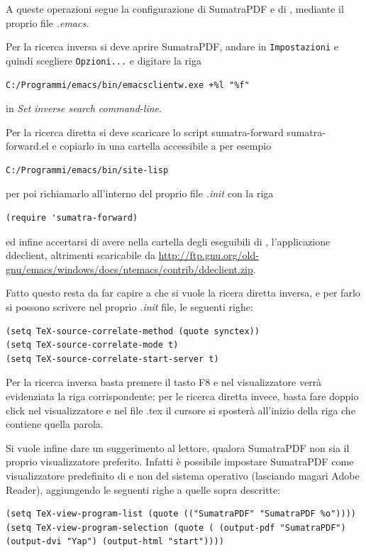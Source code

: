 \documentclass[11pt,a4paper]{article}
\begin{document}
A queste operazioni segue la configurazione di SumatraPDF e di \emacs,
mediante il proprio file \emph{.emacs}.

Per la ricerca inversa si deve aprire SumatraPDF, andare in
\texttt{Impostazioni} e quindi scegliere \texttt{Opzioni...} e
digitare la riga
\begin{Verbatim}
C:/Programmi/emacs/bin/emacsclientw.exe +%l "%f"
\end{Verbatim}
in \emph{Set inverse search command-line}.

Per la ricerca diretta si deve scaricare lo script
sumatra-forward %
{sumatra-forward.el} %
e copiarlo in una cartella accessibile a \emacs{} per esempio
\begin{Verbatim}
C:/Programmi/emacs/bin/site-lisp
\end{Verbatim}
 per poi richiamarlo all'interno del proprio file \emph{.init} con la riga
\begin{Verbatim}
(require 'sumatra-forward)
\end{Verbatim}
ed infine accertarsi di avere nella cartella degli eseguibili di
\emacs, l'applicazione \textsf{ddeclient}, altrimenti scaricabile da %
\url{http://ftp.gnu.org/old-gnu/emacs/windows/docs/ntemacs/contrib/ddeclient.zip}.

Fatto questo resta da far capire a \emacs{} che si vuole la ricera
diretta inversa, e per farlo si possono scrivere nel proprio
\emph{.init} file, le seguenti righe:
\begin{Verbatim}
(setq TeX-source-correlate-method (quote synctex))
(setq TeX-source-correlate-mode t)
(setq TeX-source-correlate-start-server t)
\end{Verbatim}

Per la ricerca inversa basta premere il tasto \textsf{F8} e nel
visualizzatore verrà evidenziata la riga corrispondente; per le
ricerca diretta invece, basta fare doppio click nel visualizzatore e
nel file .tex il cursore si sposterà all'inizio della riga che
contiene quella parola.

Si vuole infine dare un suggerimento al lettore, qualora
\textsf{SumatraPDF} non sia il proprio visualizzatore
preferito. Infatti è possibile impostare \textsf{SumatraPDF} come
visualizzatore predefinito di \emacs{} e non del sistema operativo
(lasciando magari \textsf{Adobe Reader}), aggiungendo le seguenti
righe a quelle sopra descritte:
\begin{Verbatim}
(setq TeX-view-program-list (quote (("SumatraPDF" "SumatraPDF %o"))))
(setq TeX-view-program-selection (quote ( (output-pdf "SumatraPDF")
(output-dvi "Yap") (output-html "start"))))
\end{Verbatim}
\end{document}
